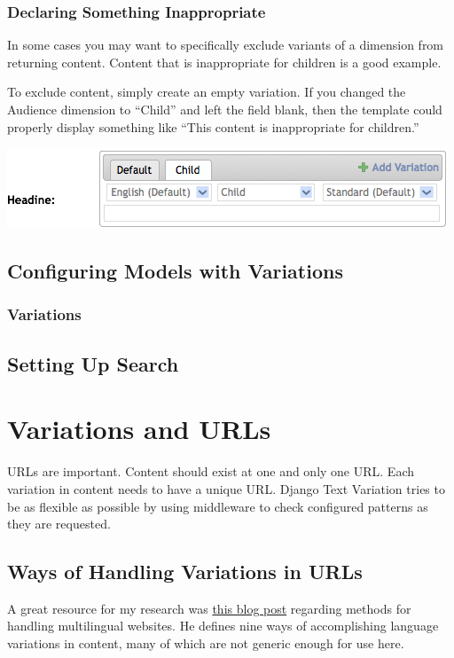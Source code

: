 \documentclass[letterpaper,10pt,english]{sphinxmanual}
\begin{document}
\subsection{Declaring Something Inappropriate}
\label{getting_started:declaring-something-inappropriate}
In some cases you may want to specifically exclude variants of a dimension from returning content. Content that is inappropriate for children is a good example.

To exclude content, simply create an empty variation. If you changed the Audience dimension to ``Child'' and left the field blank, then the template could properly display something like ``This content is inappropriate for children.''

\includegraphics{variations-admin-interface-exclude.png}


\section{Configuring Models with Variations}
\label{getting_started:configuring-models-with-variations}

\subsection{Variations}
\label{getting_started:variations}

\section{Setting Up Search}
\label{getting_started:setting-up-search}

\chapter{Variations and URLs}
\label{variations_and_urls:variations-and-urls}\label{variations_and_urls::doc}
URLs are important. Content should exist at one and only one URL. Each variation in content needs to have a unique URL. Django Text Variation tries to be as flexible as possible by using middleware to check configured patterns as they are requested.


\section{Ways of Handling Variations in URLs}
\label{variations_and_urls:ways-of-handling-variations-in-urls}
A great resource for my research was
\href{http://h3h.net/technology/designing-urls-for-multilingual-websites}{this blog post} regarding methods for handling multilingual websites. He defines nine ways of accomplishing language variations in content, many of which are not generic enough for use here.
\end{document}
